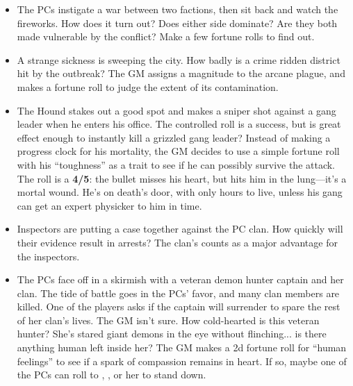 \begin{itemize}
\item    The PCs instigate a war between two factions, then sit back and watch the fireworks. How does it turn out? Does either side dominate? Are they both made vulnerable by the conflict? Make a few fortune rolls to find out.
\item    A strange sickness is sweeping the city. How badly is a crime ridden district hit by the outbreak? The GM assigns a magnitude to the arcane plague, and makes a fortune roll to judge the extent of its contamination.
\item    The Hound stakes out a good spot and makes a sniper shot against a gang leader when he enters his office. The controlled  roll is a success, but is great effect enough to instantly kill a grizzled gang leader? Instead of making a progress clock for his mortality, the GM decides to use a simple fortune roll with his ``toughness'' as a trait to see if he can possibly survive the attack. The roll is a \textbf{4/5}: the bullet misses his heart, but hits him in the lung—it’s a mortal wound. He’s on death’s door, with only hours to live, unless his gang can get an expert physicker to him in time.
\item    Inspectors are putting a case together against the PC clan. How quickly will their evidence result in arrests? The clan’s  counts as a major advantage for the inspectors.
\item    The PCs face off in a skirmish with a veteran demon hunter captain and her clan. The tide of battle goes in the PCs’ favor, and many clan members are killed. One of the players asks if the captain will surrender to spare the rest of her clan’s lives. The GM isn’t sure. How cold-hearted is this veteran hunter? She’s stared giant demons in the eye without flinching... is there anything human left inside her? The GM makes a 2d fortune roll for ``human feelings'' to see if a spark of compassion remains in heart. If so, maybe one of the PCs can roll to , , or  her to stand down.
\end{itemize}


